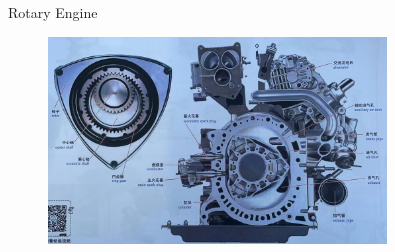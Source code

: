 \begin{frame}
	\begin{block}{Rotary Engine}
		\begin{figure}[htbp]
			\centering
			\includegraphics[width=0.8\textwidth]{2-4}
		\end{figure}
	\end{block}
\end{frame}

